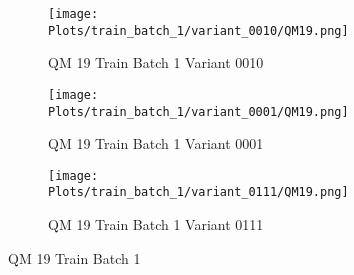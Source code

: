 \documentclass{DissertateFigs}
\begin{document}
\begin{figure}[t!]
\medskip

    \begin{subfigure}{0.47\textwidth}
    \texttt{[image: Plots/train\_batch\_1/variant\_0010/QM19.png]}
    \caption{QM 19 Train Batch 1 Variant 0010}
    \end{subfigure}
    \begin{subfigure}{0.47\textwidth}
    \texttt{[image: Plots/train\_batch\_1/variant\_0001/QM19.png]}
    \caption{QM 19 Train Batch 1 Variant 0001}
    \end{subfigure}

\medskip

    \begin{subfigure}{0.47\textwidth}
    \texttt{[image: Plots/train\_batch\_1/variant\_0111/QM19.png]}
    \caption{QM 19 Train Batch 1 Variant 0111}
    \end{subfigure}
\caption{QM 19 Train Batch 1}
    \end{figure}
\clearpage
\end{document}
